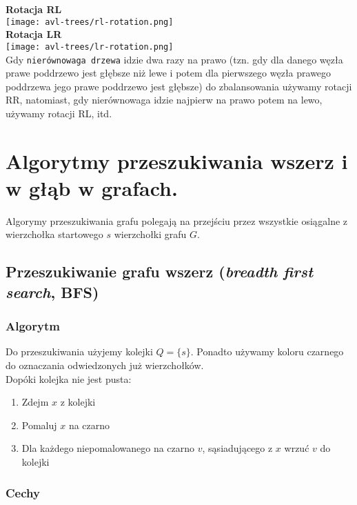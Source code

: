 \documentclass[main.tex]{subfiles}
\begin{document}
    \textbf{Rotacja RL} \\

    \texttt{[image: avl-trees/rl-rotation.png]} \\

    \textbf{Rotacja LR} \\

    \texttt{[image: avl-trees/lr-rotation.png]} \\

    \noindent Gdy \texttt{nierównowaga drzewa} idzie dwa razy na prawo (tzn. gdy dla danego węzła prawe poddrzewo jest głębsze niż lewe i potem dla pierwszego węzła prawego poddrzewa jego prawe poddrzewo jest głębsze) do zbalansowania używamy rotacji RR, natomiast, gdy nierównowaga idzie najpierw na prawo potem na lewo, używamy rotacji RL, itd.

    \newpage

    \section{Algorytmy przeszukiwania wszerz i w głąb w grafach.}

    Algorymy przeszukiwania grafu polegają na przejściu przez wszystkie osiągalne z wierzchołka
    startowego $s$ wierzchołki grafu $G$.

    \subsection{Przeszukiwanie grafu wszerz (\textit{breadth first search}, BFS)}

    \subsubsection{Algorytm}

    Do przeszukiwania użyjemy kolejki $Q = \{s\}$. Ponadto używamy koloru czarnego do
    oznaczania odwiedzonych już wierzchołków.\[\]
    Dopóki kolejka nie jest pusta:
    \begin{enumerate}
        \item Zdejm $x$ z kolejki
        \item Pomaluj $x$ na czarno
        \item Dla każdego niepomalowanego na czarno $v$, sąsiadującego z $x$ wrzuć
        $v$ do kolejki
    \end{enumerate}

    \subsubsection{Cechy}
\end{document}
